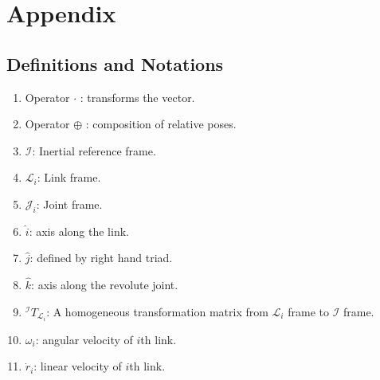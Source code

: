 \section{Appendix}
\subsection{Definitions and Notations}
\begin{enumerate}
    \item Operator $ \cdot $ : transforms the vector.
    \item Operator $\oplus$ : composition of relative poses.
    \item $\mathcal{I}$: Inertial reference frame.
    \item $\mathcal{L}_i$: Link frame.
    \item $\mathcal{J}_i$: Joint frame.
    \item $\hat{i}$: axis along the link.
    \item $\hat{j}$: defined by right hand triad.
    \item $\hat{k}$: axis along the revolute joint.
    \item $^\mathcal{I}T_{\mathcal{L}_i}$: A homogeneous transformation matrix from $\mathcal{L}_i$ frame to $\mathcal{I}$ frame.
    \item $\omega_i$: angular velocity of $i$th link.
    \item $\dot{r}_i$: linear velocity of $i$th link.
\end{enumerate}

\pagebreak